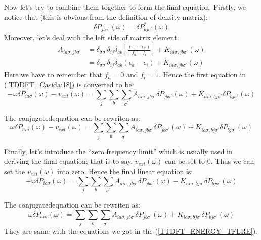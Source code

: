 Now let's try to combine them together to form the final equation.
Firstly, we notice that (this is obvious from the definition of
density matrix): 
\begin{equation}
\label{TDDFT_Casida:16}
 \delta P_{jb\sigma^{'}} (\omega) = \delta P^{*}_{bj\sigma^{'}}
(\omega)
\end{equation}
Moreover, let's deal with the left side of matrix element:
\begin{equation}
\label{TDDFT_Casida:17} 
\begin{split}
 A_{ia\sigma, jb\sigma^{'}} &=
\delta_{\sigma\sigma^{'}}\delta_{ij}\delta_{ab}\left[ 
\frac{(\epsilon_{i} - \epsilon_{a})}{f_{a} -
f_{i}} \right] 
+ K_{ia\sigma, jb\sigma^{'}}(\omega) \\
&=\delta_{\sigma\sigma^{'}}\delta_{ij}\delta_{ab}(\epsilon_{a} -
\epsilon_{i}) + K_{ia\sigma, jb\sigma^{'}}(\omega) 
\end{split}
\end{equation}  
Here we have to remember that $f_{a} = 0$ and $f_{i} = 1$.
Hence the first equation in (\ref{TDDFT_Casida:18}) is
converted to be:
\begin{equation}
 \label{TDDFT_Casida:20}
-\omega \delta P_{ia\sigma} (\omega) - v_{ext}(\omega) = 
\sum_{j}\sum_{b}\sum_{\sigma^{'}}A_{ai\sigma, jb\sigma^{'}}\delta
P_{jb\sigma^{'}}
(\omega) + K_{ai\sigma, bj\sigma^{'}}\delta P_{bj\sigma^{'}}(\omega)
\end{equation} 

The conjugatedequation can be rewriten as:
\begin{equation}
 \label{TDDFT_Casida:21}
\omega \delta P_{ai\sigma} (\omega) - v_{ext}(\omega) = 
\sum_{j}\sum_{b}\sum_{\sigma^{'}}A_{ia\sigma, jb\sigma^{'}}\delta
P_{jb\sigma^{'}}
(\omega) + K_{ia\sigma, bj\sigma^{'}}\delta P_{bj\sigma^{'}}(\omega)
\end{equation} 

Finally, let's introduce the ``zero frequency limit'' which is
usually used in deriving the final equation; that is to say,
$v_{ext}(\omega)$ can be set to $0$. Thus we can set the
$v_{ext}(\omega)$ into zero. Hence the final linear equation is:
\begin{equation}
 \label{TDDFT_Casida_final:1}
-\omega \delta P_{ia\sigma} (\omega)  = 
\sum_{j}\sum_{b}\sum_{\sigma^{'}}A_{ai\sigma, jb\sigma^{'}}\delta
P_{jb\sigma^{'}}
(\omega) + K_{ai\sigma, bj\sigma^{'}}\delta P_{bj\sigma^{'}}(\omega)
\end{equation} 

The conjugatedequation can be rewriten as:
\begin{equation}
 \label{TDDFT_Casida_final:2}
\omega \delta P_{ai\sigma} (\omega)  = 
\sum_{j}\sum_{b}\sum_{\sigma^{'}}A_{ia\sigma, jb\sigma^{'}}\delta
P_{jb\sigma^{'}}
(\omega) + K_{ia\sigma, bj\sigma^{'}}\delta P_{bj\sigma^{'}}(\omega)
\end{equation} 
They are same with the equations we got in the
(\ref{TTDFT_ENERGY_TFLRE}).


